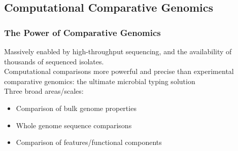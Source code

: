
\subsection{Computational Comparative Genomics}

\begin{frame}
  \frametitle{The Power of Comparative Genomics}
  Massively enabled by high-throughput sequencing, and the availability of thousands of sequenced isolates.\\[0.5cm]
  Computational comparisons more powerful and precise than experimental comparative genomics: the ultimate microbial typing solution\\[0.5cm]
  Three broad areas/scales:
  \begin{itemize}
    \item Comparison of bulk genome properties
    \item Whole genome sequence comparisons
    \item Comparison of features/functional components
  \end{itemize}    
\end{frame}


